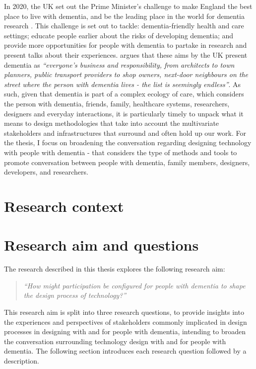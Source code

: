 In 2020, the UK set out the Prime Minister's challenge to make England the best place to live with dementia, and be the leading place in the world for dementia research \citep{budgett2021designing}. This challenge is set out to tackle: dementia-friendly health and care settings; educate people earlier about the risks of developing dementia; and provide more opportunities for people with dementia to partake in research and present talks about their experiences. \cite{keady2017social} argues that these aims by the UK present dementia as \textit{``everyone's business and responsibility, from architects to town planners, public transport providers to shop owners, next-door neighbours on the street where the person with dementia lives - the list is seemingly endless''}. As such, given that dementia is part of a complex ecology of care, which considers the person with dementia, friends, family, healthcare systems, researchers, designers and everyday interactions, it is particularly timely to unpack what it means to design methodologies that take into account the multivariate stakeholders and infrastructures that surround and often hold up our work. For the thesis, I focus on broadening the conversation regarding designing technology with people with dementia - that considers the type of methods and tools to promote conversation between people with dementia, family members, designers, developers, and researchers.

\section{Research context}
\label{Intro: ResearchContext}

\section{Research aim and questions}
\label{Intro:RQ}
The research described in this thesis explores the following research aim:
\begin{quote}
    \textit{``How might participation be configured for people with dementia to shape the design process of technology?''}
\end{quote}
This research aim is split into three research questions, to provide insights into the experiences and perspectives of stakeholders commonly implicated in design processes in designing with and for people with dementia, intending to broaden the conversation surrounding technology design with and for people with dementia. The following section introduces each research question followed by a description.

